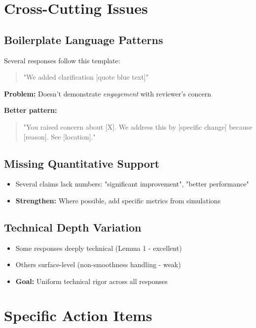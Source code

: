 \documentclass[11pt]{article}
\begin{document}
\section{Cross-Cutting Issues}

\subsection{Boilerplate Language Patterns}

Several responses follow this template:
\begin{quote}
"We added clarification [quote blue text]"
\end{quote}

\textbf{Problem:} Doesn't demonstrate \textit{engagement} with reviewer's concern

\textbf{Better pattern:}
\begin{quote}
"You raised concern about [X]. We address this by [specific change] because [reason]. See [location]."
\end{quote}

\subsection{Missing Quantitative Support}

\begin{itemize}
\item Several claims lack numbers: "significant improvement", "better performance"
\item \textbf{Strengthen:} Where possible, add specific metrics from simulations
\end{itemize}

\subsection{Technical Depth Variation}

\begin{itemize}
\item Some responses deeply technical (Lemma 1 - excellent)
\item Others surface-level (non-smoothness handling - weak)
\item \textbf{Goal:} Uniform technical rigor across all responses
\end{itemize}

\section{Specific Action Items}
\end{document}
